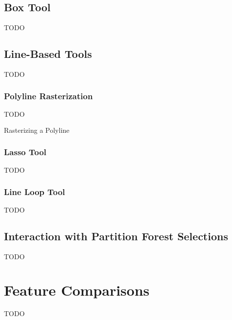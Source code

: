 \subsection{Box Tool}

TODO

\subsection{Line-Based Tools}

TODO

\subsubsection{Polyline Rasterization}

TODO

\begin{stulisting}[p]
\caption{Rasterizing a Polyline}
\label{code:appendixval-rasterizepolyline}

\end{stulisting}

\subsubsection{Lasso Tool}

TODO

\subsubsection{Line Loop Tool}

TODO

\subsection{Interaction with Partition Forest Selections}

TODO

\section{Feature Comparisons}

TODO
